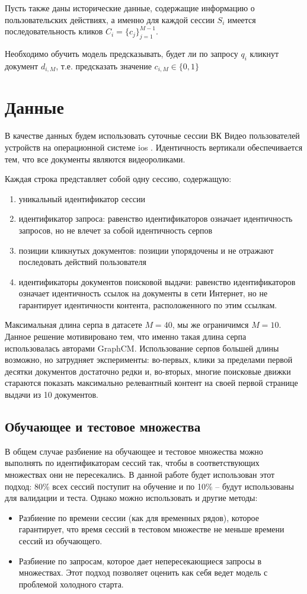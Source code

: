 \documentclass[diploma]{nanolab2015}
\begin{document}
Пусть также даны исторические данные, содержащие информацию о пользовательских действиях, а именно для каждой сессии $S_i$ имеется последовательность кликов $C_i = \{c_j\}_{j=1}^{M-1}$.

Необходимо обучить модель предсказывать, будет ли по запросу $q_i$ кликнут документ $d_{i,M}$, т.е. предсказать значение $c_{i,M} \in \{0, 1\}$
\section{Данные}
В качестве данных будем использовать суточные сессии ВК Видео пользователей устройств на операционной системе ios \cite{vkds}. Идентичность вертикали обеспечивается тем, что все документы являются видеороликами.

Каждая строка представляет собой одну сессию, содержащую:

\begin{enumerate}
    \item уникальный идентификатор сессии
    \item идентификатор запроса: равенство идентификаторов означает идентичность запросов, но не влечет за собой идентичность серпов
    \item позиции кликнутых документов: позиции упорядочены и не отражают последовать действий пользователя
    \item идентификаторы документов поисковой выдачи: равенство идентификаторов означает идентичность ссылок на документы в сети Интернет, но не гарантирует идентичности контента, расположенного по этим ссылкам.
\end{enumerate}

Максимальная длина серпа в датасете $M = 40$, мы же ограничимся $M = 10$. Данное решение мотивировано тем, что именно такая длина серпа использовалась авторами GraphCM. Использование серпов большей длины возможно, но затрудняет эксперименты: во-первых, клики за пределами первой десятки документов достаточно редки и, во-вторых, многие поисковые движки стараются показать максимально релевантный контент на своей первой странице выдачи из 10 документов.

\subsection{Обучающее и тестовое множества}
В общем случае разбиение на обучающее и тестовое множества можно выполнять по идентификаторам сессий так, чтобы в соответствующих множествах они не пересекались. В данной работе будет использован этот подход: 80\% всех сессий поступит на обучение и по 10\% -- будут использованы для валидации и теста. Однако можно использовать и другие методы:
\begin{itemize}
    \item Разбиение по времени сессии (как для временных рядов), которое гарантирует, что время сессий в тестовом множестве не меньше времени сессий из обучающего.
    \item Разбиение по запросам, которое дает непересекающиеся запросы в множествах. Этот подход позволяет оценить как себя ведет модель с проблемой холодного старта.
\end{itemize}
\end{document}
